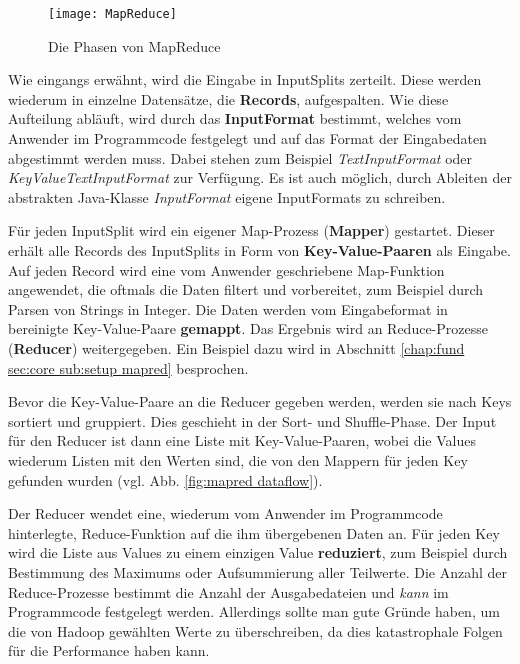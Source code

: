 \begin{figure}[ht]
    \centering
    \texttt{[image: MapReduce]}
    \caption[Die Phasen von MapReduce]{Die Phasen von MapReduce\parencite[Seite 34, Figure 2-4]{white_hadoop_2015}}
    \label{fig:mapred}
\end{figure}
Wie eingangs erwähnt, wird die Eingabe in InputSplits zerteilt. Diese werden wiederum in einzelne Datensätze, die \textbf{Records}, aufgespalten. Wie diese Aufteilung abläuft, wird durch das \textbf{InputFormat} bestimmt, welches vom Anwender im Programmcode festgelegt und auf das Format der Eingabedaten abgestimmt werden muss. Dabei stehen zum Beispiel \textit{TextInputFormat} oder \textit{KeyValueTextInputFormat} zur Verfügung. Es ist auch möglich, durch Ableiten der abstrakten Java-Klasse \textit{InputFormat} eigene InputFormats zu schreiben.\cite*{white_hadoop_2015}
\par
Für jeden InputSplit wird ein eigener Map-Prozess (\textbf{Mapper}) gestartet. Dieser erhält alle Records des InputSplits in Form von \textbf{Key-Value-Paaren} als Eingabe. Auf jeden Record wird eine vom Anwender geschriebene Map-Funktion angewendet, die oftmals die Daten filtert und vorbereitet, zum Beispiel durch Parsen von Strings in Integer. Die Daten werden vom Eingabeformat in bereinigte Key-Value-Paare \textbf{gemappt}. Das Ergebnis wird an Reduce-Prozesse (\textbf{Reducer}) weitergegeben. Ein Beispiel dazu wird in Abschnitt \ref{chap:fund sec:core sub:setup mapred} besprochen.
\par
Bevor die Key-Value-Paare an die Reducer gegeben werden, werden sie nach Keys sortiert und gruppiert. Dies geschieht in der Sort- und Shuffle-Phase. Der Input für den Reducer ist dann eine Liste mit Key-Value-Paaren, wobei die Values wiederum Listen mit den Werten sind, die von den Mappern für jeden Key gefunden wurden (vgl. Abb. \ref{fig:mapred dataflow}). 
\par
Der Reducer wendet eine, wiederum vom Anwender im Programmcode hinterlegte, Reduce-Funktion auf die ihm übergebenen Daten an. Für jeden Key wird die Liste aus Values zu einem einzigen Value \textbf{reduziert}, zum Beispiel durch Bestimmung des Maximums oder Aufsummierung aller Teilwerte. Die Anzahl der Reduce-Prozesse bestimmt die Anzahl der Ausgabedateien und \textit{kann} im Programmcode festgelegt werden. Allerdings sollte man gute Gründe haben, um die von Hadoop gewählten Werte zu überschreiben, da dies katastrophale Folgen für die Performance haben kann.\cite{infrabot_howmanymapsandreduces_2019} 

